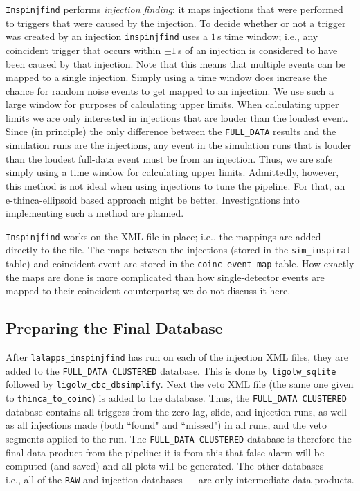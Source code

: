 \verb|Inspinjfind| performs \emph{injection finding}: it maps injections that
were performed to triggers that were caused by the injection. To decide whether
or not a trigger was created by an injection \verb|inspinjfind| uses a $1\,$s
time window; i.e., any coincident trigger that occurs within $\pm 1\,$s of an
injection is considered to have been caused by that injection. Note that this
means that multiple events can be mapped to a single injection. Simply using a
time window does increase the chance for random noise events to get mapped to
an injection. We use such a large window for purposes of calculating upper
limits. When calculating upper limits we are only interested in injections that
are louder than the loudest event. Since (in principle) the only difference
between the \verb|FULL_DATA| results and the simulation runs are the
injections, any event in the simulation runs that is louder than the loudest
full-data event must be from an injection. Thus, we are safe simply using a
time window for calculating upper limits. Admittedly, however, this method is
not ideal when using injections to tune the pipeline. For that, an
e-thinca-ellipsoid based approach might be better. Investigations into
implementing such a method are planned.

\verb|Inspinjfind| works on the XML file in place; i.e., the mappings are added
directly to the file. The maps between the injections (stored in the
\verb|sim_inspiral| table) and coincident event are stored in the
\verb|coinc_event_map| table. How exactly the maps are done is more complicated
than how single-detector events are mapped to their coincident counterparts; we
do not discuss it here.

\subsection{Preparing the Final Database}
\label{sec:compute_durations}

After \verb|lalapps_inspinjfind| has run on each of the injection XML files,
they are added to the \verb|FULL_DATA CLUSTERED| database. This is done by
\verb|ligolw_sqlite| followed by \verb|ligolw_cbc_dbsimplify|. Next the veto
XML file (the same one given to \verb|thinca_to_coinc|) is added to the
database. Thus, the \verb|FULL_DATA CLUSTERED| database contains all triggers
from the zero-lag, slide, and injection runs, as well as all injections made
(both ``found" and ``missed") in all runs, and the veto segments applied to the
run. The \verb|FULL_DATA CLUSTERED| database is therefore the final data
product from the pipeline: it is from this that false alarm will be computed
(and saved) and all plots will be generated. The other databases --- i.e., all
of the \verb|RAW| and injection databases --- are only intermediate data
products.

